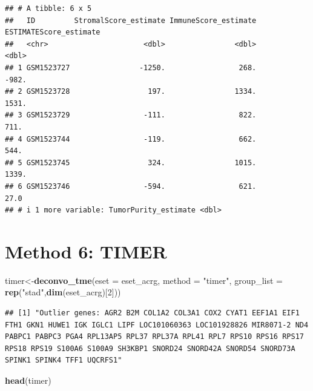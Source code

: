 \documentclass[
  12pt,
]{book}
\newenvironment{Shaded}{\begin{snugshade}}{\end{snugshade}}
\newcommand{\AttributeTok}[1]{\textcolor[rgb]{0.13,0.29,0.53}{#1}}
\newcommand{\DecValTok}[1]{\textcolor[rgb]{0.00,0.00,0.81}{#1}}
\newcommand{\FunctionTok}[1]{\textcolor[rgb]{0.13,0.29,0.53}{\textbf{#1}}}
\newcommand{\NormalTok}[1]{#1}
\newcommand{\OtherTok}[1]{\textcolor[rgb]{0.56,0.35,0.01}{#1}}
\newcommand{\StringTok}[1]{\textcolor[rgb]{0.31,0.60,0.02}{#1}}
\begin{document}
\begin{verbatim}
## # A tibble: 6 x 5
##   ID         StromalScore_estimate ImmuneScore_estimate ESTIMATEScore_estimate
##   <chr>                      <dbl>                <dbl>                  <dbl>
## 1 GSM1523727                -1250.                 268.                 -982. 
## 2 GSM1523728                  197.                1334.                 1531. 
## 3 GSM1523729                 -111.                 822.                  711. 
## 4 GSM1523744                 -119.                 662.                  544. 
## 5 GSM1523745                  324.                1015.                 1339. 
## 6 GSM1523746                 -594.                 621.                   27.0
## # i 1 more variable: TumorPurity_estimate <dbl>
\end{verbatim}

\hypertarget{method-6-timer}{%
\section{Method 6: TIMER}\label{method-6-timer}}

\begin{Shaded}
\begin{Highlighting}[]
\NormalTok{timer}\OtherTok{\textless{}{-}}\FunctionTok{deconvo\_tme}\NormalTok{(}\AttributeTok{eset =}\NormalTok{ eset\_acrg, }\AttributeTok{method =} \StringTok{"timer"}\NormalTok{, }\AttributeTok{group\_list =} \FunctionTok{rep}\NormalTok{(}\StringTok{"stad"}\NormalTok{,}\FunctionTok{dim}\NormalTok{(eset\_acrg)[}\DecValTok{2}\NormalTok{]))}
\end{Highlighting}
\end{Shaded}

\begin{verbatim}
## [1] "Outlier genes: AGR2 B2M COL1A2 COL3A1 COX2 CYAT1 EEF1A1 EIF1 FTH1 GKN1 HUWE1 IGK IGLC1 LIPF LOC101060363 LOC101928826 MIR8071-2 ND4 PABPC1 PABPC3 PGA4 RPL13AP5 RPL37 RPL37A RPL41 RPL7 RPS10 RPS16 RPS17 RPS18 RPS19 S100A6 S100A9 SH3KBP1 SNORD24 SNORD42A SNORD54 SNORD73A SPINK1 SPINK4 TFF1 UQCRFS1"
\end{verbatim}

\begin{Shaded}
\begin{Highlighting}[]
\FunctionTok{head}\NormalTok{(timer)}
\end{Highlighting}
\end{Shaded}
\end{document}
